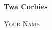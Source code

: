 \documentclass[letterpaper,12pt]{article}
\begin{document}
\begin{center}
    {\fontsize{24pt}{24pt}\textbf{Twa Corbies}}\\
\end{center}

\begin{flushright}
    \textsc{Your Name}
\end{flushright}

\end{document}
